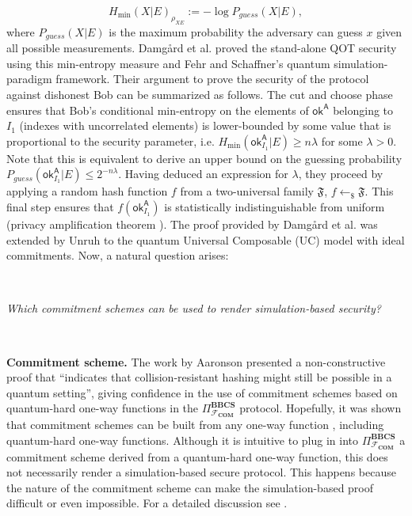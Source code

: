 $$H_{\text{min}}(X | E)_{\rho_{X E}} := -\log P_{guess}(X|E),$$ 
where $P_{guess}(X|E)$ is the maximum probability the adversary can guess $x$ given all possible measurements. Damg{\aa}rd et al. \cite{DFLSS09} proved the stand-alone QOT security using this min-entropy measure and Fehr and Schaffner's \cite{FS09} quantum simulation-paradigm framework. Their argument to prove the security of the protocol against dishonest Bob can be summarized as follows. The cut and choose phase ensures that Bob's conditional min-entropy on the elements of $\mathsf{ok}^{\mathsf{A}}$ belonging to $I_{1}$ (indexes with uncorrelated elements) is lower-bounded by some value that is proportional to the security parameter, i.e. $H_{\text{min}}(\mathsf{ok}^{\mathsf{A}}_{I_{1}} | E) \geq n\lambda$ for some $\lambda > 0$. Note that this is equivalent to derive an upper bound on the guessing probability $P_{guess}(\mathsf{ok}^{\mathsf{A}}_{I_{1}}|E) \leq 2^{-n\lambda}$. Having deduced an expression for $\lambda$, they proceed by applying a random hash function $f$ from a two-universal family $\mathfrak{F}$, $f\leftarrow_{\$}\mathfrak{F}$. This final step ensures that $f(\mathsf{ok}^{\mathsf{A}}_{I_{1}})$ is statistically indistinguishable from uniform (privacy amplification theorem \cite{DFRSS07, RK05, R05}). The proof provided by Damg{\aa}rd et al. \cite{DFLSS09} was extended by Unruh \cite{U10} to the quantum Universal Composable (UC) model with ideal commitments. Now, a natural question arises: 

\

\centerline{\textit{Which commitment schemes can be used to render simulation-based security?}}

\

\noindent\textbf{Commitment scheme.} The work by Aaronson \cite{A02} presented a non-constructive proof that ``indicates that collision-resistant hashing might still be possible in a quantum setting'', giving confidence in the use of commitment schemes based on quantum-hard one-way functions in the $\Pi^{\textbf{BBCS}}_{\mathcal{F}_{\textbf{COM}}}$ protocol. Hopefully, it was shown that commitment schemes can be built from any one-way function \cite{N91, HILL99, HR07}, including quantum-hard one-way functions. Although it is intuitive to plug in into $\Pi^{\textbf{BBCS}}_{\mathcal{F}_{\textbf{COM}}}$ a commitment scheme derived from a quantum-hard one-way function, this does not necessarily render a simulation-based secure protocol. This happens because the nature of the commitment scheme can make the simulation-based proof difficult or even impossible. For a detailed discussion see \cite{GLSV21}.

